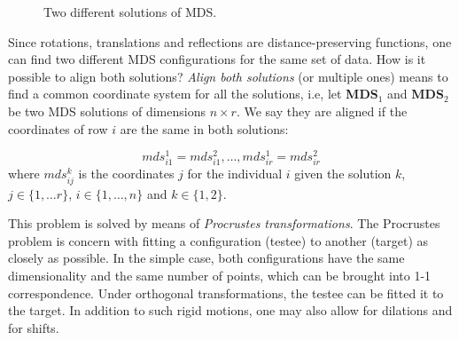 \documentclass[11pt]{report}
\begin{document}
\begin{figure}[!ht]
    \centering
    \qquad
    \caption{Two different solutions of MDS.}%
    \label{twosol}%
\end{figure}


\indent Since rotations, translations and reflections are distance-preserving 
functions, one can find two different MDS configurations 
for the same set of data. How is it possible to align both solutions? 
\textit{Align both solutions} (or multiple ones) means to find a common 
coordinate system for all the solutions, i.e, let \textbf{MDS$_1$} and 
\textbf{MDS$_2$} be two MDS solutions of dimensions $n \times r$. We say they 
are aligned if the coordinates of row $i$ are the same in both solutions:

\[
mds_{i1}^1 = mds_{i1}^2, \dots, mds_{ir}^1 = mds_{ir}^2
\]
where $mds_{ij}^k$ is the coordinates $j$ for the individual $i$ given the 
solution $k$, $j \in \{1, \dots r\}$, $i \in \{1, \dots, n\}$ and 
$k \in \{1,2\}$.


\indent This problem is solved by means of \textit{Procrustes transformations}.  
The Procrustes problem is concern with fitting a configuration (testee)
to another (target) as closely as possible. In the simple case, both 
configurations have the same dimensionality and the same number of points, which
can be brought into 1-1 correspondence. Under orthogonal transformations, 
the testee can be fitted it to the target. In addition to such rigid motions, 
one may also allow for dilations and for shifts.
\end{document}
